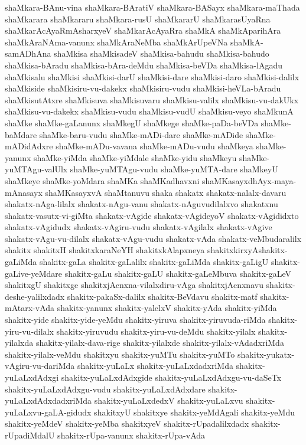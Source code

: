 {shaMkara-BAnu-vina
shaMkara-BAratiV
shaMkara-BASayx
shaMkara-maThada
shaMkarara
shaMkararu
shaMkara-rusU
shaMkararU
shaMkarasUyaRna
shaMkarAcAyaRmAsharxyeV
shaMkarAcAyaRra
shaMkA
shaMkAparihAra
shaMkAraNAma-vanunx
shaMkAraNeMba
shaMkArUpeVNa
shaMkA-samADhAna
shaMkisa
shaMkisadeV
shaMkisa-bahudu
shaMkisa-bahudo
shaMkisa-bAradu
shaMkisa-bAra-deMdu
shaMkisa-beVDa
shaMkisa-lAgadu
shaMkisalu
shaMkisi
shaMkisi-darU
shaMkisi-dare
shaMkisi-daro
shaMkisi-dalilx
shaMkiside
shaMkisiru-vu-dakekx
shaMkisiru-vudu
shaMkisi-heVLa-bAradu
shaMkisutAtxre
shaMkisuva
shaMkisuvaru
shaMkisu-valilx
shaMkisu-vu-dakUkx
shaMkisu-vu-dakekx
shaMkisu-vudu
shaMkisu-vudU
shaMkisu-veyo
shaMkunA
shaMke
shaMke-gaLanunx
shaMkegU
shaMkege
shaMke-paDa-beVDa
shaMke-baMdare
shaMke-baru-vudu
shaMke-mADi-dare
shaMke-mADide
shaMke-mADidAdxre
shaMke-mADu-vavana
shaMke-mADu-vudu
shaMkeya
shaMke-yanunx
shaMke-yiMda
shaMke-yiMdale
shaMke-yidu
shaMkeyu
shaMke-yuMTAgu-valUlx
shaMke-yuMTAgu-vudu
shaMke-yuMTA-dare
shaMkeyU
shaMkeye
shaMke-yoMdara
shaMKa
shaMKadhavxni
shaMKasayxdhAyx-maya-mAnasayx
shaMKasayxvA
shaMtanuvu
shaka
shakatx
shakatx-nalalx-davaru
shakatx-nAga-lilalx
shakatx-nAgu-vanu
shakatx-nAguvudilalxvo
shakatxnu
shakatx-vasutx-vi-giMta
shakatx-vAgide
shakatx-vAgideyoV
shakatx-vAgididxto
shakatx-vAgidudx
shakatx-vAgiru-vudu
shakatx-vAgilalx
shakatx-vAgive
shakatx-vAgu-vu-dilalx
shakatx-vAgu-vudu
shakatx-vAda
shakatx-veMbudaralilx
shakitx
shakitxH
shakitxkaraNeYH
shakitxkAlapxneya
shakitxkirxyAshakitx-gaLiMda
shakitx-gaLa
shakitx-gaLalilx
shakitx-gaLiMda
shakitx-gaLigU
shakitx-gaLive-yeMdare
shakitx-gaLu
shakitx-gaLU
shakitx-gaLeMbuva
shakitx-gaLeV
shakitxgU
shakitxge
shakitxjAcnxna-vilalxdiru-vAga
shakitxjAcnxnavu
shakitx-deshe-yalilxdadx
shakitx-pakaSx-dalilx
shakitx-BeVdavu
shakitx-matf
shakitx-mAtarx-vAda
shakitx-yanunx
shakitx-yalelxV
shakitx-yAda
shakitx-yiMda
shakitx-yide
shakitx-yide-yeMdu
shakitx-yiruva
shakitx-yiruvuda-riMda
shakitx-yiru-vu-dilalx
shakitx-yiruvudu
shakitx-yiru-vu-deMdu
shakitx-yilalx
shakitx-yilalxda
shakitx-yilalx-dava-rige
shakitx-yilalxde
shakitx-yilalx-vAdadxriMda
shakitx-yilalx-veMdu
shakitxyu
shakitx-yuMTu
shakitx-yuMTo
shakitx-yukatx-vAgiru-vu-dariMda
shakitx-yuLaLx
shakitx-yuLaLxdadxriMda
shakitx-yuLaLxdAdxgi
shakitx-yuLaLxdAdxgide
shakitx-yuLaLxdAdxgu-vu-daSeTx
shakitx-yuLaLxdAdxgu-vudu
shakitx-yuLaLxdAdxdare
shakitx-yuLaLxdAdxdadxriMda
shakitx-yuLaLxdedxV
shakitx-yuLaLxvu
shakitx-yuLaLxvu-gaLA-gidudx
shakitxyU
shakitxye
shakitx-yeMdAgali
shakitx-yeMdu
shakitx-yeMdeV
shakitx-yeMba
shakitxyeV
shakitx-rUpadalilxdadx
shakitx-rUpadiMdalU
shakitx-rUpa-vanunx
shakitx-rUpa-vAda
}
